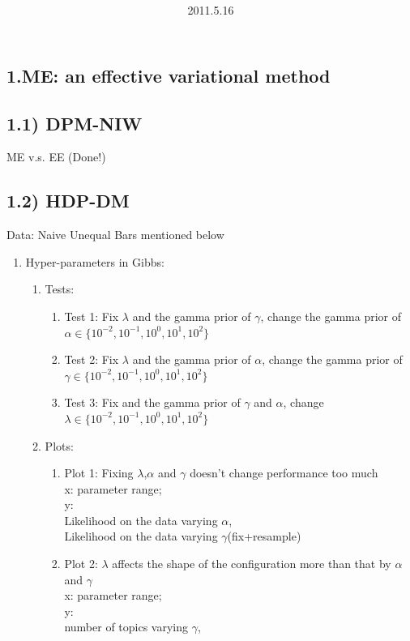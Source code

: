 \documentclass{article}
\title{\vspace{0.3in}\textmd{\textbf{\hmwkTitle}}}
\date{2011.5.16}
\begin{document}
\begin{spacing}{1.1}
\maketitle
\section{1.ME: an effective variational method}
\subsection{1.1) DPM-NIW}
ME v.s. EE (Done!)
\subsection{1.2) HDP-DM}
Data: Naive Unequal Bars mentioned below
\begin{enumerate}
 \item Hyper-parameters in Gibbs:\\
\begin{enumerate}
\item Tests:
\begin{enumerate}
\item Test 1: Fix $\lambda$ and the gamma prior of $\gamma$, 
 change the gamma prior of $\alpha\in\{10^{-2},10^{-1},10^{0},10^{1},10^{2}\}$
\item Test 2: Fix $\lambda$ and the gamma prior of $\alpha$, 
change the gamma prior of $\gamma\in\{10^{-2},10^{-1},10^{0},10^{1},10^{2}\}$
\item Test 3: Fix and the gamma prior of $\gamma$ and $\alpha$, 
change $\lambda\in\{10^{-2},10^{-1},10^{0},10^{1},10^{2}\}$
\end{enumerate}
\item Plots:
\begin{enumerate}
\item Plot 1: Fixing $\lambda$,$\alpha$ and $\gamma$ doesn't change performance too much\\ 
x: parameter range; \\
y: \\
Likelihood on the data varying $\alpha$, \\
Likelihood on the data varying $\gamma$(fix+resample)
\item Plot 2: $\lambda$ affects the shape of the configuration more than that by $\alpha$ and $\gamma$ \\
 x: parameter range; \\
y: \\number of topics varying $\gamma$,\\ 

\end{enumerate}
\end{enumerate}
\end{enumerate}
\end{spacing}
\end{document}
